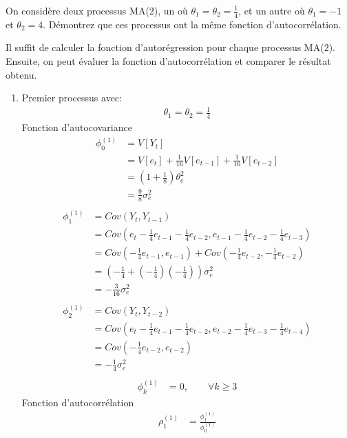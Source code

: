 \begin{exercice}
  On considère deux processus MA(2), un où $\theta_1 = \theta_2 = \frac{1}{4}$, et un autre où $\theta_1=-1$ et $\theta_2 = 4$. Démontrez que ces processus ont la même fonction d'autocorrélation.
  \begin{sol}
    Il suffit de calculer la fonction d'autorégression pour chaque processus MA(2).
Ensuite, on peut évaluer la fonction d'autocorrélation et comparer le résultat obtenu.

\begin{enumerate}
\item Premier processus avec:
\begin{align*}
\theta_1 = \theta_2 = \frac{1}{4}
\end{align*}
Fonction d'autocovariance
\begin{align*}
\phi_0^{(1)} &= V[Y_t] \\
&= V[e_t]+\frac{1}{16}V[e_{t-1}]+\frac{1}{16}V[e_{t-2}] \\
&= (1+\frac{1}{8})\theta^2_e \\
&= \frac{9}{8} \sigma^2_e \\
\end{align*}
\begin{align*}
\phi_1^{(1)} &= Cov(Y_t,Y_{t-1}) \\
&= Cov(e_t - \frac{1}{4}e_{t-1} - \frac{1}{4}e_{t-2}, e_{t-1} - \frac{1}{4}e_{t-2} - \frac{1}{4}e_{t-3} )\\
&= Cov(-\frac{1}{4}e_{t-1},e_{t-1}) + Cov(-\frac{1}{4}e_{t-2},-\frac{1}{4}e_{t-2}) \\
&= (-\frac{1}{4}+(-\frac{1}{4})(-\frac{1}{4})) \sigma^2_e \\
&= -\frac{3}{16} \sigma^2_e \\
\end{align*}
\begin{align*}
\phi_2^{(1)} &= Cov(Y_t,Y_{t-2}) \\
&= Cov(e_t - \frac{1}{4}e_{t-1} - \frac{1}{4}e_{t-2}, e_{t-2} - \frac{1}{4}e_{t-3} - \frac{1}{4}e_{t-4} )\\
&= Cov(-\frac{1}{4}e_{t-2},e_{t-2}) \\
&= -\frac{1}{4} \sigma^2_e \\
\end{align*}
\begin{align*}
\phi_k^{(1)} &= 0, \qquad \forall k \geq 3
\end{align*}
Fonction d'autocorrélation
\begin{align*}
\rho_1^{(1)} &= \frac{\phi_1^{(1)}}{\phi_0^{(1)}} \\

\end{align*}
\end{enumerate}
\end{sol}
\end{exercice}
